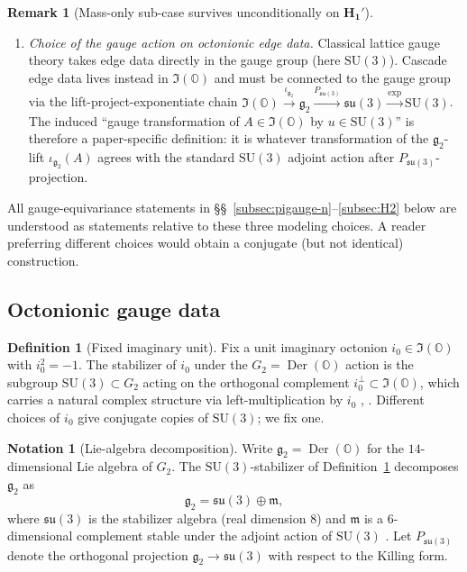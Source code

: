 \documentclass[11pt, a4paper]{amsart}
\theoremstyle{definition}
\newtheorem{definition}[theorem]{Definition}
\newtheorem{remark}[theorem]{Remark}
\newtheorem{notation}[theorem]{Notation}
\newcommand{\OO}{\mathbb{O}}
\newcommand{\Der}{\operatorname{Der}}
\begin{document}
\begin{remark}[Mass-only sub-case survives unconditionally on $\mathbf{H_1'}$]
\begin{enumerate}
\item[\textup{(M3)}] \emph{Choice of the gauge action on
  octonionic edge data.} Classical lattice gauge theory takes
  edge data directly in the gauge group (here $\mathrm{SU}(3)$).
  Cascade edge data lives instead in $\Im(\OO)$ and must be
  connected to the gauge group via the
  lift-project-exponentiate chain $\Im(\OO) \xrightarrow{\iota_{\mathfrak{g}_2}}
  \mathfrak{g}_2 \xrightarrow{P_{\mathfrak{su}(3)}} \mathfrak{su}(3)
  \xrightarrow{\exp} \mathrm{SU}(3)$. The induced ``gauge
  transformation of $A \in \Im(\OO)$ by $u \in \mathrm{SU}(3)$''
  is therefore a paper-specific definition: it is whatever
  transformation of the $\mathfrak{g}_2$-lift $\iota_{\mathfrak{g}_2}(A)$
  agrees with the standard $\mathrm{SU}(3)$ adjoint action after
  $P_{\mathfrak{su}(3)}$-projection.
\end{enumerate}

All gauge-equivariance statements in
\S\S~\ref{subsec:pigauge-n}--\ref{subsec:H2} below are understood
as statements relative to these three modeling choices. A reader
preferring different choices would obtain a conjugate (but not
identical) construction.

\subsection{Octonionic gauge data}
\label{subsec:octo-gauge}

\begin{definition}[Fixed imaginary unit]
\label{def:i-fixed}
Fix a unit imaginary octonion $i_0 \in \Im(\OO)$ with
$i_0^2 = -1$. The stabilizer of $i_0$ under the $G_2 = \Der(\OO)$
action is the subgroup $\mathrm{SU}(3) \subset G_2$ acting on the
orthogonal complement $i_0^\perp \subset \Im(\OO)$, which carries a
natural complex structure via left-multiplication by $i_0$
\cite[\S 6]{CascadeEmbeddings}, \cite[\S 1]{BaezOctonions}.
Different choices of $i_0$ give conjugate copies of $\mathrm{SU}(3)$;
we fix one.
\end{definition}

\begin{notation}[Lie-algebra decomposition]
\label{not:g2-decomp}
Write $\mathfrak{g}_2 = \Der(\OO)$ for the $14$-dimensional Lie
algebra of $G_2$. The $\mathrm{SU}(3)$-stabilizer of
Definition~\ref{def:i-fixed} decomposes $\mathfrak{g}_2$ as
\[
  \mathfrak{g}_2 = \mathfrak{su}(3) \oplus \mathfrak{m},
\]
where $\mathfrak{su}(3)$ is the stabilizer algebra (real dimension
$8$) and $\mathfrak{m}$ is a $6$-dimensional complement stable
under the adjoint action of $\mathrm{SU}(3)$
\cite[\S 2.4]{BaezOctonions}. Let $P_{\mathfrak{su}(3)}$ denote the
orthogonal projection $\mathfrak{g}_2 \to \mathfrak{su}(3)$ with
respect to the Killing form.
\end{notation}


\end{remark}
\end{document}
